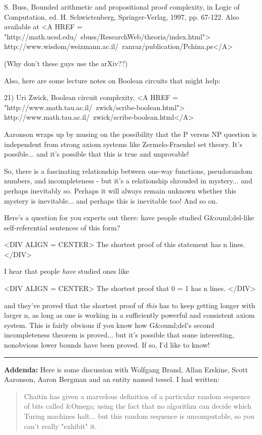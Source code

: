 S. Buss, Bounded arithmetic and propositional proof complexity,
in Logic of Computation, ed. H. Schwictenberg, Springer-Verlag, 1997,
pp. 67-122.  Also available at 
<A HREF = "http://math.ucsd.edu/~sbuss/ResearchWeb/theoria/index.html">
http://www.wisdom/weizmann.ac.il/~ranraz/publication/Pchina.ps</A>

(Why don't these guys use the arXiv??)  

Also, here are some lecture notes on Boolean circuits that might help:

21) Uri Zwick, Boolean circuit complexity, 
<A HREF = "http://www.math.tau.ac.il/~zwick/scribe-boolean.html">
http://www.math.tau.ac.il/~zwick/scribe-boolean.html</A>

Aaronson wraps up by musing on the possibility that the P versus NP 
question is independent from strong axiom systems like Zermelo-Fraenkel 
set theory.  It's possible... and it's possible that this is true and
unprovable!

So, there is a fascinating relationship between one-way functions, 
pseudorandom numbers, and incompleteness - but it's a relationship 
shrouded in mystery... and perhaps inevitably so.  Perhaps it will
always remain unknown whether this mystery is inevitable... and perhaps 
this is inevitable too!  And so on.

Here's a question for you experts out there: have people studied G&ouml;del-like
self-referential sentences of this form?

<DIV ALIGN = CENTER>
             The shortest proof of this statement has n lines.
</DIV>

I hear that people \emph{have} studied ones like 

<DIV ALIGN = CENTER>
              The shortest proof that 0 = 1 has n lines.
</DIV>

and they've proved that the shortest proof of \emph{this} has to keep getting 
longer with larger n, as long as one is working in a sufficiently powerful
and consistent axiom system.  This is fairly obvious if you know how
G&ouml;del's second incompleteness theorem is proved... but it's possible that
some interesting, nonobvious lower bounds have been proved.  If so, I'd
like to know!

\par\noindent\rule{\textwidth}{0.4pt}
\textbf{Addenda:}
Here is some discussion with Wolfgang Brand, Allan Erskine, 
Scott Aaronson, Aaron Bergman and an entity named tessel.  I had written:

\begin{quote}
Chaitin has given a marvelous definition of a 
particular random sequence of bits called &Omega; using the fact that no 
algorithm can decide which Turing machines halt... but this random 
sequence is uncomputable, so you can't really "exhibit" it.
\end{quote}
    

